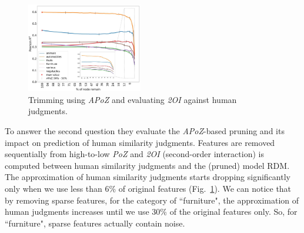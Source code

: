 \begin{figure}
  \centering
  \includegraphics[width=0.45\textwidth]{images/apoz_4.png}
  \caption{Trimming using \textit{APoZ} and evaluating \textit{2OI} against human judgments.}
  \label{fig:apoz_4}
\end{figure}

To answer the second question they evaluate the \textit{APoZ}-based pruning and its impact on prediction of human similarity judgments. Features are removed sequentially from high-to-low \textit{PoZ} and \textit{2OI} (second-order interaction) is computed between human similarity judgments and the (pruned) model RDM.
The approximation of human similarity judgments starts dropping significantly only when we use less than 6\% of original features (Fig.~\ref{fig:apoz_4}).
We can notice that by removing sparse features, for the category of ``furniture", the approximation of human judgments increases until we use 30\% of the original features only. So, for ``furniture", sparse features actually contain noise.

